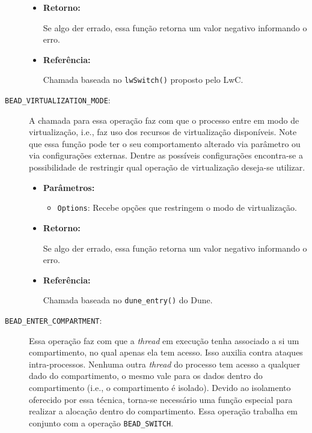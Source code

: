 \begin{description}
\begin{itemize}
    \item \textbf{Retorno:}

Se algo der errado, essa função retorna um valor negativo informando o erro.

    \item \textbf{Referência:}

Chamada baseada no \texttt{lwSwitch()} proposto pelo LwC.

  \end{itemize}

  \item [\texttt{BEAD\_VIRTUALIZATION\_MODE}:]

A chamada para essa operação faz com que o processo entre em modo de
virtualização, i.e., faz uso dos recursos de virtualização disponíveis. Note
que essa função pode ter o seu comportamento alterado via parâmetro ou via
configurações externas. Dentre as possíveis configurações encontra-se a
possibilidade de restringir qual operação de virtualização deseja-se utilizar.

  \begin{itemize}
    \item \textbf{Parâmetros:}

    \begin{itemize}
      \item \texttt{Options}: Recebe opções que restringem o modo de virtualização.
    \end{itemize}

    \item \textbf{Retorno:}

Se algo der errado, essa função retorna um valor negativo informando o erro.

    \item \textbf{Referência:}

Chamada baseada no \texttt{dune\_entry()} do Dune.

  \end{itemize}

	\item [\texttt{BEAD\_ENTER\_COMPARTMENT}:]

Essa operação faz com que a \emph{thread} em execução tenha associado a si um
compartimento, no qual apenas ela tem acesso. Isso auxilia contra
ataques intra-processos. Nenhuma outra \emph{thread} do processo tem acesso a qualquer
dado do compartimento, o mesmo vale para os dados dentro do compartimento
(i.e., o compartimento é isolado). Devido ao isolamento oferecido por essa
técnica, torna-se necessário uma função especial para realizar a alocação
dentro do compartimento. Essa operação trabalha em conjunto com a operação
\texttt{BEAD\_SWITCH}.


\end{description}
